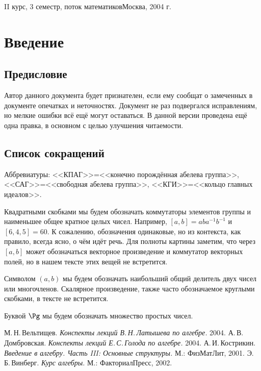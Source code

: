\documentclass[a4paper]{article}
\begin{document}
{II курс, 3 семестр, поток математиков}{Москва, 2004 г.}

\pagebreak
\tableofcontents
\pagebreak

\section*{Введение}
\subsection*{Предисловие}

Автор данного документа будет признателен, если ему сообщат о замеченных в документе опечатках и неточностях.
Документ не раз подвергался исправлениям, но мелкие ошибки всё ещё могут оставаться.
В данной версии проведена ещё одна правка, в основном с целью улучшения читаемости.

\medskip\dmvntrail

\subsection*{Список сокращений}

\begin{points}{-3}
\item Аббревиатуры: <<КПАГ>>=<<конечно порождённая абелева группа>>,
      <<САГ>>=<<свободная абелева группа>>, <<КГИ>>=<<кольцо главных идеалов>>.
\item Квадратными скобками мы будем обозначать коммутаторы элементов группы и наименьшее общее кратное
      целых чисел. Например, $[a,b] = aba^{-1}b^{-1}$ и $[6,4,5] = 60$.
      К сожалению, обозначения одинаковые, но из контекста, как правило, всегда ясно,
      о чём идёт речь. Для полноты картины заметим, что через $[a,b]$ может обозначаться векторное
      произведение и коммутатор векторных полей, но в нашем тексте этих вещей не встретится.
\item Символом $(a,b)$ мы будем обозначать наибольший общий делитель двух чисел или многочленов.
      Скалярное произведение, также часто обозначаемое круглыми скобками, в тексте не встретится.
\item Буквой $\Pg$ мы будем обозначать множество простых чисел.
\end{points}

\begin{thebibliography}{4}
    \setlength\itemsep{-3pt}
     М.\,Н.\,Вельтищев. \emph{Конспекты лекций В.\,Н.\,Латышева по алгебре.} 2004.
        А.\,В.\,Домбровская. \emph{Конспекты лекций Е.\,С.\,Голода по алгебре.} 2004.
             А.\,И.\,Кострикин. \emph{Введение в алгебру. Часть III: Основные структуры.} М.: ФизМатЛит, 2001.
               Э.\,Б.\,Винберг. \emph{Курс алгебры.} М.: Факториал\ч Пресс, 2002.
\end{thebibliography}
\end{document}
